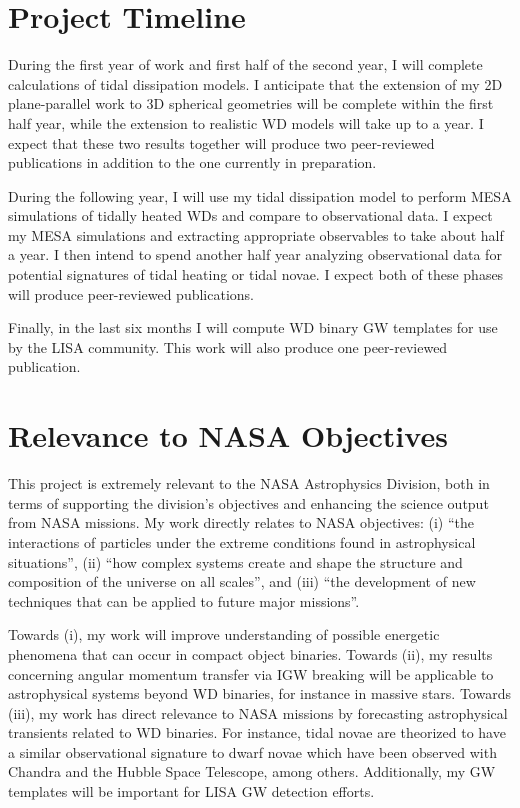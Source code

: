 \documentclass[12pt,
        usenames, %
        dvipsnames %
    ]{article}
\begin{document}
\section{Project Timeline}

During the first year of work and first half of the second year, I will complete
calculations of tidal dissipation models. I anticipate that the extension of my
2D plane-parallel work to 3D spherical geometries will be complete within the
first half year, while the extension to realistic WD models will take up to a
year. I expect that these two results together will produce two peer-reviewed
publications in addition to the one currently in preparation.

During the following year, I will use my tidal dissipation model to perform MESA
simulations of tidally heated WDs and compare to observational data. I expect my
MESA simulations and extracting appropriate observables to take about half a
year. I then intend to spend another half year analyzing observational data for
potential signatures of tidal heating or tidal novae. I expect both of these
phases will produce peer-reviewed publications.

Finally, in the last six months I will compute WD binary GW templates for use by
the LISA community. This work will also produce one peer-reviewed publication.

\section{Relevance to NASA Objectives}

This project is extremely relevant to the NASA Astrophysics Division, both in
terms of supporting the division's objectives and enhancing the science output
from NASA missions. My work directly relates to NASA objectives: (i) ``the
interactions of particles under the extreme conditions found in astrophysical
situations'', (ii) ``how complex systems create and shape the structure and
composition of the universe on all scales'', and (iii) ``the development of new
techniques that can be applied to future major missions''.

Towards (i), my work will improve understanding of possible energetic phenomena
that can occur in compact object binaries. Towards (ii), my results concerning
angular momentum transfer via IGW breaking will be applicable to astrophysical
systems beyond WD binaries, for instance in massive stars\cite{l_trans_rev}.
Towards (iii), my work has direct relevance to NASA missions by forecasting
astrophysical transients related to WD binaries. For instance, tidal novae are
theorized to have a similar observational signature to dwarf novae which have
been observed with Chandra and the Hubble Space Telescope, among others.
Additionally, my GW templates will be important for LISA GW detection efforts.
\end{document}
